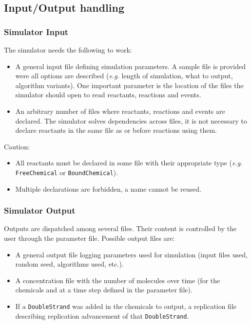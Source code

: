 
\subsection{Input/Output handling}

\subsubsection{Simulator Input}

The simulator needs the following to work:
\begin{itemize}
  \item A general input file defining simulation parameters.
  A sample file is provided were all options are described
  (\textit{e.g.} length of simulation, what to output, algorithm variants).
  One important parameter is the location of the files the simulator
  should open to read reactants, reactions and events.
  \item An arbitrary number of files where reactants, reactions and events are declared.
  The simulator solves dependencies across files, it is not necessary
  to declare reactants in the same file as or before reactions using them.
\end{itemize}

Caution:
\begin{itemize}
\item All reactants must be declared in some file with their appropriate type
(\textit{e.g.} \texttt{FreeChemical} or \texttt{BoundChemical}).
\item Multiple declarations are forbidden, a name cannot be reused.
\end{itemize}

\subsubsection{Simulator Output}

Outputs are dispatched among several files.
Their content is controlled by the user through the parameter file.
Possible output files are:
\begin{itemize}
\item A general output file logging parameters used for simulation (input files used, random seed, algorithms used, etc.).
\item A concentration file with the number of molecules over time (for the chemicals and at a time step defined in the parameter file).
\item If a \texttt{DoubleStrand} was added in the chemicals to output,
a replication file describing replication advancement of that \texttt{DoubleStrand}.
\end{itemize}
